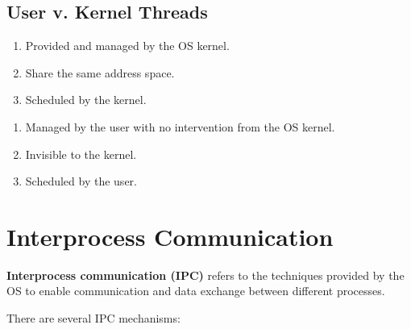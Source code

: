 \documentclass{report}
\newcommand{\definitionBegin}[1]{\begin{tcolorbox}[title={Definition: #1}]}
\newcommand{\definitionEnd}{\end{tcolorbox}}
\begin{document}
\section{User v. Kernel Threads}
\begin{tcbraster}[raster columns=2, raster equal height, raster force size=false]
  \begin{tcolorbox}[colback=teal!5!white,colframe=black!75!teal,title=Kernel]
    \begin{enumerate}[label=\textit{(\roman*)}]
    \item Provided and managed by the OS kernel.
    \item Share the same address space.
    \item Scheduled by the kernel.
    \end{enumerate}
  \end{tcolorbox}
  \begin{tcolorbox}[colback=yellow!5!white,colframe=black!75!yellow,title=User]
    \begin{enumerate}[label=\textit{(\roman*)}]
    \item Managed by the user with no intervention from the OS kernel.
    \item Invisible to the kernel.
    \item Scheduled by the user.
    \end{enumerate}
  \end{tcolorbox}
\end{tcbraster}










\chapter{Interprocess Communication}
\definitionBegin{Interprocess Communication}
\textbf{Interprocess communication (IPC)} refers to the techniques provided by the OS to enable
communication and data exchange between different processes.
\definitionEnd

There are several IPC mechanisms:
\end{document}
